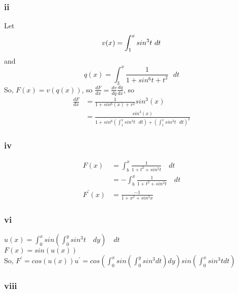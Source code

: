 \documentclass{article}
\begin{document}
\subsubsection*{ii}
Let 
\begin{equation*}
v(x) = \int_{1}^{x} sin^{3}t \text{ } dt\\
\end{equation*}
and 
\begin{equation*}
q(x) = \int_{3}^{x}\frac{1}{1+sin^{6}t + t^2} \text{ } dt
\end{equation*}
So, $F(x) = v(q(x))$, so $\frac{dF}{dx} = \frac{dv}{dq} \frac{dq}{dx}$, so 
\begin{align*}
\frac{dF}{dx} &= \frac{1}{1+sin^{6}(x) + v^{2}} sin^{3}(x)\\
&= \frac{sin^{3}(x)}{1+sin^{6}(\int_{1}^{x} sin^{3}t \text{ } dt) + (\int_{1}^{x} sin^{3}t \text{ } dt)^{2}}
\end{align*}
\subsubsection*{iv}
\begin{align*}
F(x) &= \int_{b}^{x} \frac{1}{1+t^{2} + sin^{2}t} \quad dt\\
&= -\int_{b}^{x} \frac{1}{1+t^{2} + sin^{2}t} \quad dt\\
F^{\prime}(x) &= \frac{-1}{1+x^{2}+sin^{2}x}
\end{align*}
\subsubsection*{vi}
$u(x) = \int_{0}^{x} sin(\int_{0}^{y}sin^{3}t \quad dy)\quad dt$\\
$F(x) = sin(u(x))$\\
So, $F^{\prime} = cos(u(x))u^{\prime} = cos(\int_{0}^{x}sin(\int_{0}^{y} sin^{3} dt)dy) sin(\int_{0}^{x}sin^{3}tdt)$
\subsubsection*{viii}
\end{document}

